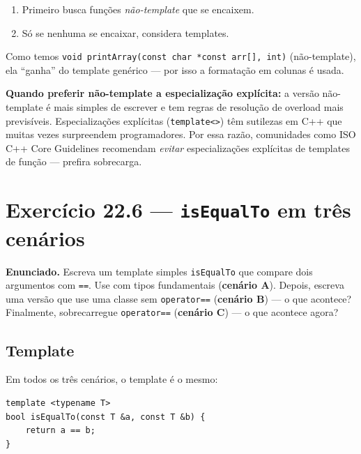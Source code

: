 \documentclass[11pt,a4paper]{article}
\begin{document}
\begin{enumerate}[leftmargin=*,itemsep=0pt]
  \item Primeiro busca fun\c{c}\~oes \emph{n\~ao-template} que se encaixem.
  \item S\'o se nenhuma se encaixar, considera templates.
\end{enumerate}

Como temos \texttt{void printArray(const char *const arr[], int)} (n\~ao-template), ela ``ganha'' do template gen\'erico --- por isso a formata\c{c}\~ao em colunas \'e usada.

\begin{boaprat}
\textbf{Quando preferir n\~ao-template a especializa\c{c}\~ao expl\'icita:} a vers\~ao n\~ao-template \'e mais simples de escrever e tem regras de resolu\c{c}\~ao de overload mais previs\'iveis. Especializa\c{c}\~oes expl\'icitas (\texttt{template<>}) t\^em sutilezas em C++ que muitas vezes surpreendem programadores. Por essa raz\~ao, comunidades como ISO C++ Core Guidelines recomendam \emph{evitar} especializa\c{c}\~oes expl\'icitas de templates de fun\c{c}\~ao --- prefira sobrecarga.
\end{boaprat}

\newpage
\section{Exerc\'icio 22.6 --- \texttt{isEqualTo} em tr\^es cen\'arios}

\begin{enunciado}
\textbf{Enunciado.} Escreva um template simples \texttt{isEqualTo} que compare dois argumentos com \texttt{==}. Use com tipos fundamentais (\textbf{cen\'ario A}). Depois, escreva uma vers\~ao que use uma classe sem \texttt{operator==} (\textbf{cen\'ario B}) --- o que acontece? Finalmente, sobrecarregue \texttt{operator==} (\textbf{cen\'ario C}) --- o que acontece agora?
\end{enunciado}

\subsection*{Template}

Em todos os tr\^es cen\'arios, o template \'e o mesmo:

\begin{lstlisting}[style=cppcode,numbers=none]
template <typename T>
bool isEqualTo(const T &a, const T &b) {
    return a == b;
}
\end{lstlisting}
\end{document}
